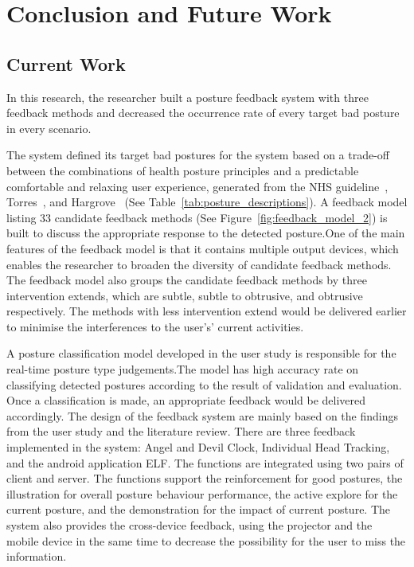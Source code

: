 \chapter{Conclusion and Future Work}

\section{Current Work}
In this research, the researcher built a posture feedback system with three feedback methods and decreased the occurrence rate of every target bad posture in every scenario.

The system defined its target bad postures for the system based on a trade-off between the combinations of health posture principles and a predictable comfortable and relaxing user experience, generated from the NHS guideline~\cite{nhs_sit_correctly}, Torres~\cite{best_viewing_distance_tv}, and Hargrove~\cite{bad_posture_back_pain} (See Table~\ref{tab:posture_descriptions}). A feedback model listing 33 candidate feedback methods (See Figure~\ref{fig:feedback_model_2}) is built to discuss the appropriate response to the detected posture.One of the main features of the feedback model is that it contains multiple output devices, which enables the researcher to broaden the diversity of candidate feedback methods. The feedback model also groups the candidate feedback methods by three intervention extends, which are subtle, subtle to obtrusive, and obtrusive respectively. The methods with less intervention extend would be delivered earlier to minimise the interferences to the user's’ current activities.

A posture classification model developed in the user study is responsible for the real-time posture type judgements.The model has high accuracy rate on classifying detected postures according to the result of validation and evaluation. Once a classification is made, an appropriate feedback would be delivered accordingly. The design of the feedback system are mainly based on the findings from the user study and the literature review. There are three feedback implemented in the system: Angel and Devil Clock, Individual Head Tracking, and the android application ELF. The functions are integrated using two pairs of client and server. The functions support the reinforcement for good postures, the illustration for overall posture behaviour performance, the active explore for the current posture, and the demonstration for the impact of current posture. The system also provides the cross-device feedback, using the projector and the mobile device in the same time to decrease the possibility for the user to miss the information.

